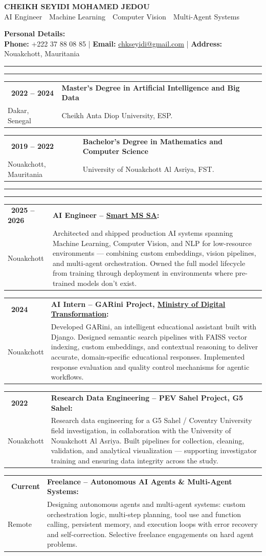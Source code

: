 \documentclass[11pt,a4paper]{extarticle}
\makeatletter
\newcommand{\cvsection}[1]{%
  \vspace{0.10cm}
  \begin{center}
    \rule{3.5cm}{0.5pt}\hspace{0.30cm}{\large\bfseries #1}\hspace{0.30cm}\rule{3.5cm}{0.5pt}
  \end{center}
  \vspace{0.05cm}
}
\newcommand{\entry}[4]{%
\noindent\begin{tabularx}{\textwidth}{@{}p{0.25\textwidth}X@{}}
\textbullet\ \textbf{#1} & \textbf{#3} \\
\hspace*{0.45cm}\small #2 & \small #4 \\
\end{tabularx}\par\vspace{0.10cm}\par\noindent\ignorespaces
}
\makeatother
\begin{document}
\begin{center}
{\Large\bfseries\color{cvgray} CHEIKH SEYIDI MOHAMED JEDOU}\\[0.15cm]
{\normalsize AI Engineer \,\textbar\, Machine Learning \,\textbar\, Computer Vision \,\textbar\, Multi-Agent Systems}
\end{center}
\vspace{-0.10cm}
\begin{center}
{\large\bfseries Personal Details:}\\[0.12cm]
\textbf{Phone:} +222 37 88 08 85 \quad | \quad
\textbf{Email:} \href{mailto:chkseyidi@gmail.com}{chkseyidi@gmail.com} \quad | \quad
\textbf{Address:} Nouakchott, Mauritania
\end{center}
\cvsection{Education}
\entry{2022 -- 2024}{Dakar, Senegal}
{Master's Degree in Artificial Intelligence and Big Data}
{Cheikh Anta Diop University, ESP.}
\entry{2019 -- 2022}{Nouakchott, Mauritania}
{Bachelor's Degree in Mathematics and Computer Science}
{University of Nouakchott Al Asriya, FST.}
\cvsection{Professional Experience}
\entry{2025 -- 2026}{Nouakchott}
{AI Engineer -- \href{https://www.smartmssa.com/}{Smart MS SA}:}
{Architected and shipped production AI systems spanning Machine Learning, Computer Vision, and NLP for low-resource environments --- combining custom embeddings, vision pipelines, and multi-agent orchestration. Owned the full model lifecycle from training through deployment in environments where pre-trained models don't exist.}
\entry{2024}{Nouakchott}
{AI Intern -- GARini Project, \href{https://mtnima.gov.mr}{Ministry of Digital Transformation}:}
{Developed GARini, an intelligent educational assistant built with Django. Designed semantic search pipelines with FAISS vector indexing, custom embeddings, and contextual reasoning to deliver accurate, domain-specific educational responses. Implemented response evaluation and quality control mechanisms for agentic workflows.}
\entry{2022}{Nouakchott}
{Research Data Engineering -- PEV Sahel Project, G5 Sahel:}
{Research data engineering for a G5 Sahel / Coventry University field investigation, in collaboration with the University of Nouakchott Al Asriya. Built pipelines for collection, cleaning, validation, and analytical visualization --- supporting investigator training and ensuring data integrity across the study.}
\entry{Current}{Remote}
{Freelance -- Autonomous AI Agents \& Multi-Agent Systems:}
{Designing autonomous agents and multi-agent systems: custom orchestration logic, multi-step planning, tool use and function calling, persistent memory, and execution loops with error recovery and self-correction. Selective freelance engagements on hard agent problems.}
\end{document}
